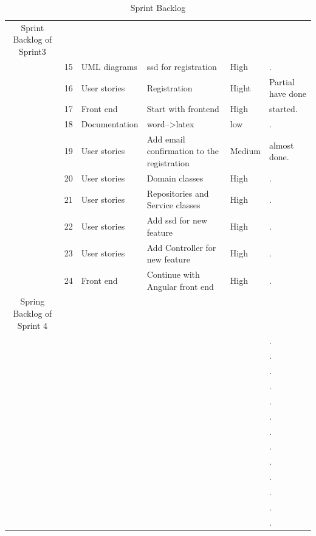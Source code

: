 \documentclass{scrartcl}
\begin{document}
\begin{table}[H]
\begin{tabular}{c@{\qquad}lllll}
                  Sprint Backlog of Sprint3 \\
                   & 15 & UML diagrams & ssd for registration  & High & . \\ \hline
                     & 16 & User stories & Registration & Hight & Partial have done \\ \hline
                      & 17 & Front end & Start with frontend & High &   started. \\ \hline
                       & 18 & Documentation & word-->latex & low & . \\ \hline
                        & 19 & User stories & Add email confirmation to the registration & Medium & almost done. \\ \hline
                         & 20 & User stories & Domain classes & High & . \\ \hline
                          & 21 & User stories & Repositories and Service classes & High & . \\ \hline
                           & 22 & User stories & Add ssd for new feature  & High & . \\ \hline
                           & 23 & User stories &  Add Controller for new feature & High & . \\ \hline
         & 24 & Front end  & Continue with Angular front end  & High & . \\ \hline
	
	Spring Backlog of Sprint 4\\
	 &  &  &  &  & . \\ \hline
	  &  &  &  &  & . \\ \hline
	   &  &  &  &  & . \\ \hline
	    &  &  &  &  & . \\ \hline
	     &  &  &  &  & . \\ \hline
	      &  &  &  &  & . \\ \hline
	       &  &  &  &  & . \\ \hline
	        &  &  &  &  & . \\ \hline
	         &  &  &  &  & . \\ \hline
	          &  &  &  &  & . \\ \hline
	           &  &  &  &  & . \\ \hline
	            &  &  &  &  & . \\ \hline
	             &  &  &  &  & . \\ \hline
	
	 
        \midrule
    \end{tabular}
    \caption{Sprint Backlog}
    \label{tab:typo}
\end{table}
\end{document}

